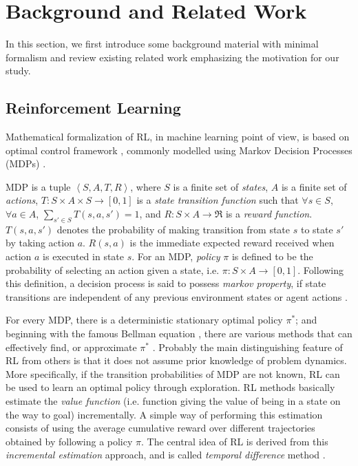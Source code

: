 \documentclass[10pt, conference, compsocconf]{IEEEtran}
\begin{document}
\section{Background and Related Work}
\label{sec:background}
In this section, we first introduce some background material with minimal formalism and review existing related work emphasizing the motivation for our study.



\subsection{Reinforcement Learning}
\label{sec:rl}

Mathematical formalization of RL, in machine learning point of view, is based on optimal control framework \cite{bellman_dynamic_1957}, commonly modelled using Markov Decision Processes (MDPs) \cite{sutton_reinforcement_1998}. 

MDP is a tuple $\left\langle S, A, T, R\right\rangle $, where $S$ is a finite set of \textit{states}, $A$ is a finite set of \textit{actions}, $T : S\times A \times S \rightarrow [0, 1]$ is a \textit{state transition function} such that $\forall s \in S$, $\forall a \in A$, $\sum_{s' \in S} T\left( s, a, s'\right) = 1$, and $R : S \times A \rightarrow \Re$ is a \textit{reward function}. $T(s, a, s')$ denotes the probability of making  transition from state $s$ to state $s'$ by taking action $a$. $R(s, a)$ is the immediate expected reward received when action $a$ is executed in state $s$. For an MDP, \textit{policy} $\pi$ is defined to be the probability of selecting an action given a state, i.e. $\pi: S\times A \rightarrow [0,1]$. Following this definition, a decision process is said to possess \textit{markov property}, if state transitions are independent of any previous environment states or agent actions \cite{kaelbling_reinforcement_1996}.


For every MDP, there is a deterministic stationary optimal policy $\pi^*$; and beginning with the famous Bellman equation \cite{bellman_dynamic_1957}, there are various methods that can effectively find, or approximate $\pi^*$ \cite{sigaud_markov_2010}. Probably the main distinguishing feature of RL from others is that it does not assume prior knowledge of problem dynamics. More specifically, if the transition probabilities of MDP are not known, RL can be used to learn an optimal policy through exploration. RL methods basically estimate the \textit{value function} (i.e. function giving the value of being in a state on the way to goal) incrementally. A simple way of performing this estimation consists of using the average cumulative reward over different trajectories obtained by following a policy $\pi$. The central idea of RL is derived from this \textit{incremental estimation} approach, and is called \textit{temporal difference} method \cite{sutton_learning_1988}. 
\end{document}
